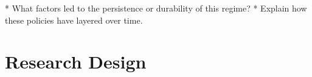 \documentclass[12pt]{article}
\begin{document}
		* What factors led to the persistence or durability of this regime?
		* Explain how these policies have layered over time.


\section{Research Design}





\newpage
    {}


\end{document}
